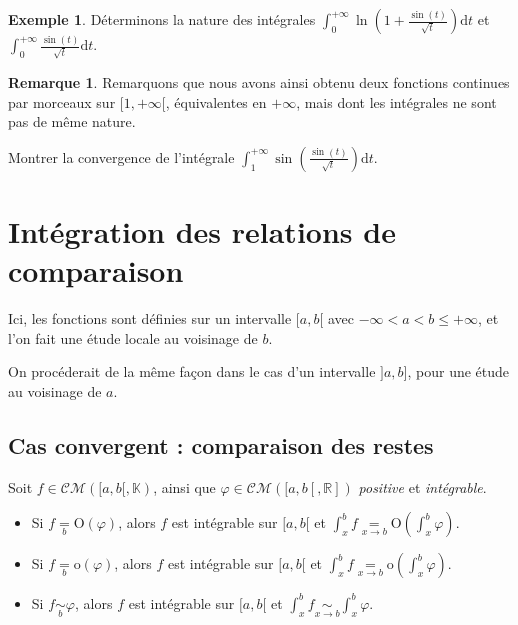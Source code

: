 \documentclass[french]{article}
\newcommand{\R}{\mathbb{R}}
\newcommand{\K}{\mathbb{K}}
\renewcommand{\o}{\text{o}}
\renewcommand{\O}{\text{O}}
\renewcommand{\d}{\text{d}}
\theoremstyle{plain}
\theoremstyle{definition}
\newtheorem*{ex}{Exemple}
\newtheorem*{rmq}{Remarque}
\theoremstyle{remark}
\begin{document}
\begin{ex}
	Déterminons la nature des intégrales $\displaystyle\int_{0}^{+\infty}\ln\left(1+\frac{\sin(t)}{\sqrt{t}}\right)\d t$ et $\displaystyle\int_{0}^{+\infty}\frac{\sin(t)}{\sqrt{t}}\d t$.
\end{ex}

\begin{rmq}
	Remarquons que nous avons ainsi obtenu deux fonctions continues par morceaux sur $[1,+\infty[$, équivalentes en $+\infty$, mais dont les intégrales ne sont pas de même nature.
\end{rmq}

\begin{exo}
	Montrer la convergence de l'intégrale $\displaystyle\int_{1}^{+\infty}\sin\left(\frac{\sin(t)}{\sqrt{t}}\right)\d t$.
\end{exo}
	
\section{Intégration des relations de comparaison}

Ici, les fonctions sont définies sur un intervalle $[a,b[$ avec $-\infty<a<b\leqslant+\infty$, et l'on fait une étude locale au voisinage de $b$.

On procéderait de la même façon dans le cas d'un intervalle $]a,b]$, pour une étude au voisinage de $a$.

\subsection{Cas convergent : comparaison des restes}

\begin{prop}%
	Soit $f\in\mathcal{CM}([a,b[,\K)$, ainsi que $\varphi\in\mathcal{CM}([a,b[,\R])$ \textit{positive} et \textit{intégrable}.
	\begin{itemize}
		\item Si $f\underset{b}{=}\O(\varphi)$, alors $f$ est intégrable sur $[a,b[$ et $\displaystyle\int_{x}^{b}f\underset{x\to b}{=}\O\left(\int_{x}^{b}\varphi\right)$.
		\item Si $f\underset{b}{=}\o(\varphi)$, alors $f$ est intégrable sur $[a,b[$ et $\displaystyle\int_{x}^{b}f\underset{x\to b}{=}\o\left(\int_{x}^{b}\varphi\right)$.
		\item Si $f\underset{b}{\sim}\varphi$, alors $f$ est intégrable sur $[a,b[$ et $\displaystyle\int_{x}^{b}f\underset{x\to b}{\sim}\int_{x}^{b}\varphi$.
	\end{itemize}
\end{prop}
\end{document}
